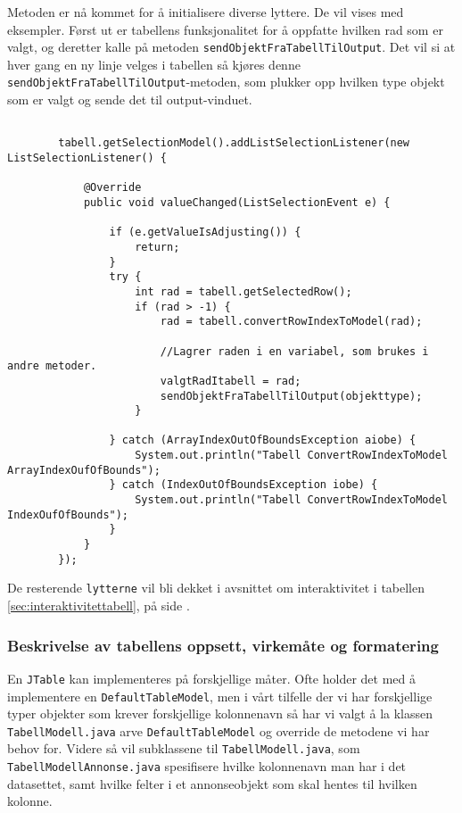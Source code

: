 Metoden er nå kommet for å initialisere diverse lyttere. De vil vises med eksempler. Først ut er tabellens funksjonalitet for å oppfatte hvilken rad som er valgt, og deretter kalle på metoden \texttt{sendObjektFraTabellTilOutput}. Det vil si at hver gang en ny linje velges i tabellen så kjøres denne \texttt{sendObjektFraTabellTilOutput}-metoden, som plukker opp hvilken type objekt som er valgt og sende det til output-vinduet. 

\begin{lstlisting}[caption=Lytteren som finner valgt rad i tabellen]

        tabell.getSelectionModel().addListSelectionListener(new ListSelectionListener() {

            @Override
            public void valueChanged(ListSelectionEvent e) {

                if (e.getValueIsAdjusting()) {
                    return;
                }
                try {
                    int rad = tabell.getSelectedRow();
                    if (rad > -1) {
                        rad = tabell.convertRowIndexToModel(rad);

                        //Lagrer raden i en variabel, som brukes i andre metoder.
                        valgtRadItabell = rad;
                        sendObjektFraTabellTilOutput(objekttype);
                    }

                } catch (ArrayIndexOutOfBoundsException aiobe) {
                    System.out.println("Tabell ConvertRowIndexToModel ArrayIndexOufOfBounds");
                } catch (IndexOutOfBoundsException iobe) {
                    System.out.println("Tabell ConvertRowIndexToModel IndexOufOfBounds");
                }
            }
        });
\end{lstlisting}

De resterende \texttt{lytterne} vil bli dekket i avsnittet om interaktivitet i tabellen \ref{sec:interaktivitettabell}, på side \pageref{sec:interaktivitettabell}.


\subsubsection{Beskrivelse av tabellens oppsett, virkemåte og formatering} \label{sec:virkemåtetabell}

En \texttt{JTable} kan implementeres på forskjellige måter. Ofte holder det med å implementere en \texttt{DefaultTableModel}, men i vårt tilfelle der vi har forskjellige typer objekter som krever forskjellige kolonnenavn så har vi valgt å la klassen \texttt{TabellModell.java} arve \texttt{DefaultTableModel} og override de metodene vi har behov for. Videre så vil subklassene til \texttt{TabellModell.java}, som \texttt{TabellModellAnnonse.java} spesifisere hvilke kolonnenavn man har i det datasettet, samt hvilke felter i et annonseobjekt som skal hentes til hvilken kolonne. 

